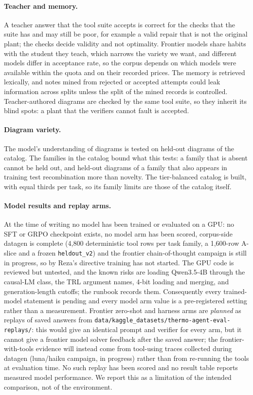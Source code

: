\paragraph{Teacher and memory.}
A teacher answer that the tool suite accepts is correct for the checks that the suite has and may still be poor, for example a valid repair that is not the original plant; the checks decide validity and not optimality. Frontier models share habits with the student they teach, which narrows the variety we want, and different models differ in acceptance rate, so the corpus depends on which models were available within the quota and on their recorded prices. The memory is retrieved lexically, and notes mined from rejected or accepted attempts could leak information across splits unless the split of the mined records is controlled. Teacher-authored diagrams are checked by the same tool suite, so they inherit its blind spots: a plant that the verifiers cannot fault is accepted.

\paragraph{Diagram variety.}
The model's understanding of diagrams is tested on held-out diagrams of the catalog. The families in the catalog bound what this tests: a family that is absent cannot be held out, and held-out diagrams of a family that also appears in training test recombination more than novelty. The tier-balanced catalog is built, with equal thirds per task, so its family limits are those of the catalog itself.

\paragraph{Model results and replay arms.}
At the time of writing no model has been trained or evaluated on a GPU: no SFT or GRPO checkpoint exists, no model arm has been scored, corpus-side datagen is complete (4,800 deterministic tool rows per task family, a 1,600-row A-slice and a frozen \texttt{heldout\_v2}) and the frontier chain-of-thought campaign is still in progress, so by Reza's directive training has not started. The GPU code is reviewed but untested, and the known risks are loading Qwen3.5-4B through the causal-LM class, the TRL argument names, 4-bit loading and merging, and generation-length cutoffs; the runbook records them. Consequently every trained-model statement is pending and every model arm value is a pre-registered setting rather than a measurement. Frontier zero-shot and harness arms are \emph{planned} as replays of saved answers from \texttt{data/kaggle\_datasets/thermo-agent-eval-replays/}: this would give an identical prompt and verifier for every arm, but it cannot give a frontier model solver feedback after the saved answer; the frontier-with-tools evidence will instead come from tool-using traces collected during datagen (luna/haiku campaign, in progress) rather than from re-running the tools at evaluation time. No such replay has been scored and no result table reports measured model performance. We report this as a limitation of the intended comparison, not of the environment.

